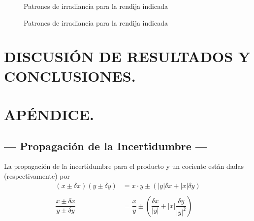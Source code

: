 \documentclass[10pt,a4paper]{article}
\begin{document}
	\begin{figure}[htbp!]
		\centering
		\hfill
		\hfill
		\hfill
		\caption{Patrones de irradiancia para la rendija indicada}
		\label{fig:P3}
	\end{figure}
	
	\begin{figure}[htbp!]
		\centering
		\hfill
		\hfill
		\hfill
		\caption{Patrones de irradiancia para la rendija indicada}
		\label{fig:P4}
	\end{figure}
		
	
\section{DISCUSIÓN DE RESULTADOS Y CONCLUSIONES.} %

% 
% 

\section{APÉNDICE.} %

\subsection{--- Propagación de la Incertidumbre ---}
	
	La propagación de la incertidumbre para el producto y un cociente están dadas (respectivamente) por
	\begin{align*}
		(x\pm\delta x)(y\pm\delta y)&=x\cdot y\pm\left(|y|\delta x+|x|\delta y \right)\\\\
		\dfrac{x\pm\delta x}{y\pm\delta y}&=\dfrac{x}{y}\pm\left(\dfrac{\delta x}{|y|}+|x|\dfrac{\delta y}{|y|^2}\right)
	\end{align*}
	
\end{document}
